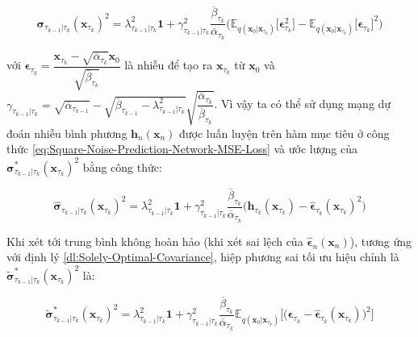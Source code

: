 \documentclass[14pt, a4paper]{article}
\numberwithin{equation}{section}
\numberwithin{figure}{section}
\numberwithin{dl}{section}
\numberwithin{md}{section}
\numberwithin{bd}{section}
\numberwithin{dn}{section}
\numberwithin{hq}{section}
\begin{document}
    \begin{equation}
        \boldsymbol{\sigma}_{\tau_{k-1} \vert \tau_k} (\boldsymbol{x}_{\tau_k})^2 = \lambda_{\tau_{k-1} \vert \tau_k}^2 \boldsymbol{1} + \gamma_{\tau_{k-1} \vert \tau_k}^2 \dfrac{\overline{\beta}_{\tau_k}}{\overline{\alpha}_{\tau_k}} \Big( \mathbb{E}_{q(\boldsymbol{x}_0 \vert \boldsymbol{x}_{\tau_k})} \lbrack \boldsymbol{\epsilon}_{\tau_k}^2 \rbrack - \mathbb{E}_{q(\boldsymbol{x}_0 \vert \boldsymbol{x}_{\tau_k})} \lbrack \boldsymbol{\epsilon}_{\tau_k} \rbrack^2 \Big)
    \end{equation}

    với $\boldsymbol{\epsilon}_{\tau_k}=\dfrac{\boldsymbol{x}_{\tau_k} - \sqrt{\overline{\alpha}_{\tau_k}} \boldsymbol{x}_0}{\sqrt{\overline{\beta}_{\tau_k}}}$ là nhiễu để tạo ra $\boldsymbol{x}_{\tau_k}$ từ $\boldsymbol{x}_0$ và $\gamma_{\tau_{k-1} \vert \tau_k}=\sqrt{\overline{\alpha}_{\tau_{k-1}}} - \sqrt{\overline{\beta}_{\tau_{k-1}} - \lambda_{\tau_{k-1} \vert \tau_k}^2} \sqrt{\dfrac{\overline{\alpha}_{\tau_k}}{\overline{\beta}_{\tau_k}}}$.
    Vì vậy ta có thể sử dụng mạng dự đoán nhiễu bình phương $\boldsymbol{h}_n(\boldsymbol{x}_n)$ được luấn luyện trên hàm mục tiêu ở công thức \ref{eq:Square-Noise-Prediction-Network-MSE-Loss} và ước lượng của $\boldsymbol{\sigma}_{\tau_{k-1} \vert \tau_k}^{\ast} (\boldsymbol{x}_{\tau_k})^2$ bằng công thức:

    \begin{equation}        
        \hat{\boldsymbol{\sigma}}_{\tau_{k-1} \vert \tau_k} (\boldsymbol{x}_{\tau_k})^2 = \lambda_{\tau_{k-1} \vert \tau_k}^2 \boldsymbol{1} + \gamma_{\tau_{k-1} \vert \tau_k}^2 \dfrac{\overline{\beta}_{\tau_k}}{\overline{\alpha}_{\tau_k}} \big( \boldsymbol{h}_{\tau_k} (\boldsymbol{x}_{\tau_k}) - \hat{\boldsymbol{\epsilon}}_{\tau_k} (\boldsymbol{x}_{\tau_k})^2 \big)
    \end{equation}

    Khi xét tới trung bình không hoàn hảo (khi xét sai lệch của $\hat{\boldsymbol{\epsilon}}_n (\boldsymbol{x}_n)$), tương ứng với định lý \ref{dl:Solely-Optimal-Covariance}, hiệp phương sai tối ưu hiệu chỉnh là $\tilde{\boldsymbol{\sigma}}_{\tau_{k-1} \vert \tau_k}^{\ast} (\boldsymbol{x}_{\tau_k})^2$ là:

    \begin{equation}
        \tilde{\boldsymbol{\sigma}}_{\tau_{k-1} \vert \tau_k}^{\ast} (\boldsymbol{x}_{\tau_k})^2 = \lambda_{\tau_{k-1} \vert \tau_k}^2 \boldsymbol{1} + \gamma_{\tau_{k-1} \vert \tau_k}^2 \dfrac{\overline{\beta}_{\tau_k}}{\overline{\alpha}_{\tau_k}} \mathbb{E}_{q(\boldsymbol{x}_0 \vert \boldsymbol{x}_{\tau_k})} \big \lbrack \big(\boldsymbol{\epsilon}_{\tau_k} - \hat{\boldsymbol{\epsilon}}_{\tau_k} (\boldsymbol{x}_{\tau_k}) \big)^2 \rbrack
    \end{equation}
\end{document}
